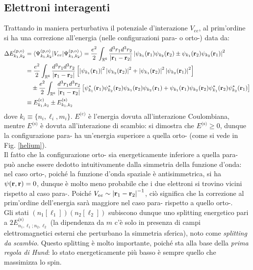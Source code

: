 \subsection{Elettroni interagenti}

Trattando in maniera perturbativa il potenziale d'interazione $ V_{ee} $, al prim'ordine si ha una correzione all'energia (nelle configurazioni para- o orto-) data da:
\begin{equation*}
	\begin{split}
		\Delta E_{k_1,k_2}^\text{(p,o)}
		& = \braket{\Psi_{k_1,k_2}^\text{(p,o)} | V_{ee} | \Psi_{k_1,k_2}^\text{(p,o)}} = \frac{e^2}{2} \int_{\mathbb{R}^6} \frac{d^3r_1 d^3r_2}{\left\lvert\mathbf{r}_1 - \mathbf{r}_2\right\rvert}  \left\lvert\psi_{k_1}(\mathbf{r}_1) \psi_{k_2}(\mathbf{r}_2) \pm \psi_{k_1}(\mathbf{r}_2) \psi_{k_2}(\mathbf{r}_1)\right\rvert^2 \\
		& = \frac{e^2}{2} \int_{\mathbb{R}^6} \frac{d^3r_1 d^3r_2}{\left\lvert\mathbf{r}_1 - \mathbf{r}_2\right\rvert} \left[ \left\lvert\psi_{k_1}(\mathbf{r}_1)\right\rvert^2 \left\lvert\psi_{k_2}(\mathbf{r}_2)\right\rvert^2 + \left\lvert\psi_{k_1}(\mathbf{r}_2)\right\rvert^2 \left\lvert\psi_{k_2}(\mathbf{r}_1)\right\rvert^2 \right] \\
		& \quad \pm \frac{e^2}{2} \int_{\mathbb{R}^6} \frac{d^3r_1 d^3r_2}{\left\lvert\mathbf{r}_1 - \mathbf{r}_2\right\rvert} \left[ \psi_{k_1}^*(\mathbf{r}_1) \psi_{k_2}^*(\mathbf{r}_2) \psi_{k_1}(\mathbf{r}_2) \psi_{k_2}(\mathbf{r}_1) + \psi_{k_1}(\mathbf{r}_1) \psi_{k_2}(\mathbf{r}_2) \psi_{k_1}^*(\mathbf{r}_2) \psi_{k_2}^*(\mathbf{r}_1) \right] \\
		& \equiv E_{k_1,k_2}^\text{(c)} \pm E_{k_1,k_2}^\text{(s)}
	\end{split}
\end{equation*}
dove $ k_i \equiv \{n_i,\ell_i,m_i\} $. $ E^\text{(c)} $ è l'energia dovuta all'interazione Coulombiana, mentre $ E^\text{(s)} $ è dovuta all'interazione di scambio: si dimostra che $ E^\text{(s)} \ge 0 $, dunque la configurazione para- ha un'energia superiore a quella orto- (come si vede in Fig. \ref{helium}). \\
Il fatto che la configurazione orto- sia energeticamente inferiore a quella para- può anche essere dedotto intuitivamente dalla simmetria della funzione d'onda: nel caso orto-, poiché la funzione d'onda spaziale è antisimmetrica, si ha $ \psi(\mathbf{r},\mathbf{r}) = 0 $, dunque è molto meno probabile che i due elettroni si trovino vicini rispetto al caso para-. Poiché $ V_{ee} \sim \left\lvert\mathbf{r}_1 - \mathbf{r}_2\right\rvert^{-1} $, ciò significa che la correzione al prim'ordine dell'energia sarà maggiore nel caso para- rispetto a quello orto-. \\
Gli stati $ (n_1[\ell_1])(n_2[\ell_2]) $ subiscono dunque uno splitting energetico pari a $ 2E^\text{(s)}_{n_1,\ell_1 ; n_2,\ell_2} $ (la dipendenza da $ m $ c'è solo in presenza di campi elettromagnetici esterni che perturbano la simmetria sferica), noto come \textit{splitting da scambio}. Questo splitting è molto importante, poiché sta alla base della \textit{prima regola di Hund}: lo stato energeticamente più basso è sempre quello che massimizza lo spin\footnotemark.











